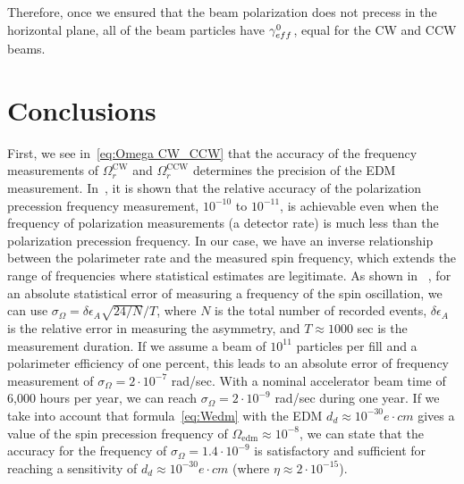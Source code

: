 \documentclass[a4paper]{jacow}
\begin{document}
Therefore, once we ensured that the beam polarization does not precess in the horizontal plane,
all of the beam particles have $\g*^0$, equal for the CW and CCW beams.


\section{Conclusions}
 
First, we see in~\eqref{eq:Omega CW_CCW} that the accuracy of the frequency measurements
of $\Omega_{r}^{\mathrm{CW}}$ and $\Omega_{r}^{\mathrm{CCW}}$   determines the precision of the EDM measurement.
In~\cite{Eversmann}, it is shown that the relative accuracy of the polarization precession frequency
measurement, $10^{-10}$ to $10^{-11}$,   is achievable even when the frequency of polarization measurements (a detector rate) is much less than the polarization precession frequency. In our case, we have an inverse relationship between the polarimeter rate and the measured spin frequency, which extends the range of frequencies where statistical estimates are legitimate. As shown in ~\cite{Aksentyev}, for an absolute statistical error of measuring a frequency of the spin oscillation, we can use $\sigma_{\Omega}=\delta\epsilon_{A}\sqrt{24/N}/T$, where $N$  is the total number of recorded events, $\delta\epsilon_{A}$   is the relative error in measuring the asymmetry, and $T\approx 1000$  sec is the measurement duration. If we assume a beam of $10^{11}$  particles per fill and a polarimeter efficiency of one percent, this leads to an absolute error of frequency measurement of  $\sigma_{\Omega}=2\cdot10^{-7}$ rad/sec. With a nominal accelerator beam time of 6,000 hours per year, we can reach $\sigma_{\Omega}=2\cdot10^{-9}$ rad/sec during one year. If we take into account that formula~\eqref{eq:Wedm} with the EDM $d_d\approx 10^{-30} e\cdot cm$  gives a value of the spin precession frequency of $\Omega_{\mathrm{edm}}\approx 10^{-8}$, we can state that the accuracy for the frequency of $\sigma_{\Omega}=1.4\cdot10^{-9}$   is satisfactory and sufficient for reaching a sensitivity of $d_d\approx 10^{-30}e\cdot cm$ (where $\eta\approx2\cdot10^{-15}$).
\end{document}
